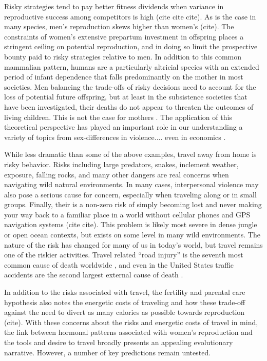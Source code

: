 Risky strategies tend to pay better fitness dividends when variance in reproductive success among competitors is high (cite cite cite).  As is the case in many species, men's reproduction skews higher than women's (cite).  The constraints of women's extensive prepartum investment in offspring places a stringent ceiling on potential reproduction, and in doing so limit the prospective bounty paid to risky strategies relative to men.  In addition to this common mammalian pattern, humans are a particularly altricial species with an extended period of infant dependence that falls predominantly on the mother in most societies.  Men balancing the trade-offs of risky decisions need to account for the loss of potential future offspring, but at least in the subsistence societies that have been investigated, their deaths do not appear to threaten the outcomes of living children.  This is not the case for mothers \cite{hill1996ache, sear2008keeps}.  The application of this theoretical perspective has played an important role in our understanding a variety of topics from sex-differences in violence.... even in economics \cite{wilson1985competitiveness}  \cite{wilson1997life} \cite{jianakoplos1998women}.

While less dramatic than some of the above examples, travel away from home is risky behavior.  Risks including large predators, snakes, inclement weather, exposure, falling rocks, and many other dangers are real concerns when navigating wild natural environments.  In many cases, interpersonal violence may also pose a serious cause for concern, especially when traveling along or in small groups.  Finally, their is a non-zero risk of simply becoming lost and never making your way back to a familiar place in a world without cellular phones and GPS navigation systems (cite cite).  This problem is likely most severe in dense jungle or open ocean contexts, but exists on some level in many wild environments.  The nature of the risk has changed for many of us in today's world, but travel remains one of the riskier activities.  Travel related ``road injury'' is the seventh most common cause of death worldwide \cite{krug2000global}, and even in the United States traffic accidents are the second largest external cause of death \cite{sherry2010cdc}.  

In addition to the risks associated with travel, the fertility and parental care hypothesis also notes the energetic costs of traveling and how these trade-off against the need to divert as many calories as possible towards reproduction (cite).  With these concerns about the risks and energetic costs of travel in mind, the link between hormonal patterns associated with women's reproduction and the tools and desire to travel broadly presents an appealing evolutionary narrative.  However, a number of key predictions remain untested.  

